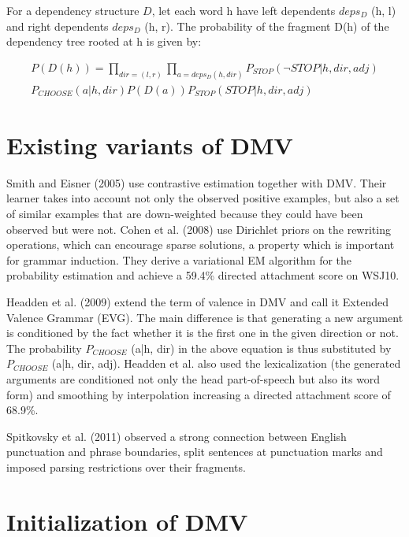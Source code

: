 \documentclass{article}
\begin{document}
For a dependency structure $D$, let each word h have left dependents $deps_D$ (h, l) and right dependents $deps_D$ (h, r). The probability of the fragment D(h) of the dependency tree rooted at h is given by:

\begin{gather*}
    P(D(h)) = \prod\limits_{dir=(l,r)} \prod\limits_{a=deps_D(h,dir)} P_{STOP} (\neg STOP | h, dir, adj) \\
    P_{CHOOSE}(a|h, dir) P(D(a)) P_{STOP}(STOP | h, dir, adj)
\end{gather*}

\section{Existing variants of DMV}

   Smith and Eisner (2005) \cite{smith2005} use contrastive estimation together with DMV. Their learner takes into account not only the observed positive examples, but also a set of similar examples that are down-weighted because they could have been observed but were not. Cohen et al. (2008) \cite{cohen2008} use Dirichlet priors on the rewriting operations, which can encourage sparse solutions, a property which is important for grammar induction. They derive a variational EM algorithm for the probability estimation and achieve a 59.4\% directed attachment score on WSJ10. 

   Headden et al. (2009) \cite{headden2009} extend the term of valence in DMV and call it Extended Valence Grammar (EVG). The main difference is that generating a new argument is conditioned by the fact whether it is the first one in the given direction or not. The probability $P_{CHOOSE}$ (a|h, dir) in the above equation is thus substituted by $P_{CHOOSE}$ (a|h, dir, adj). Headden et al. also used the lexicalization (the generated arguments are conditioned not only the head part-of-speech but also its word form) and smoothing by interpolation increasing a directed attachment score of 68.9\%.

   Spitkovsky et al. (2011) \cite{spitkovsky2011b} observed a strong connection between English punctuation and phrase boundaries, split sentences at punctuation marks and imposed parsing restrictions over their fragments.

\section{Initialization of DMV}
\end{document}

